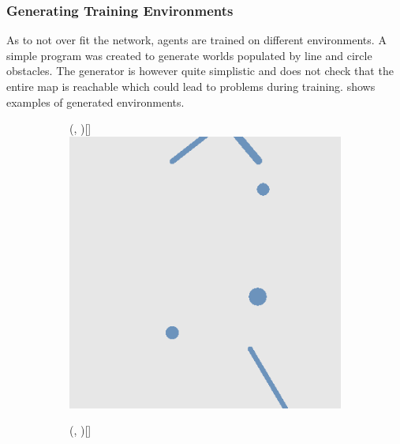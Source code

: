 \subsubsection{Generating Training Environments}
As to not over fit the network, agents are trained on different environments. A simple program was created to generate worlds populated by line and circle obstacles. The generator is however quite simplistic and does not check that the entire map is reachable which could lead to problems during training.  shows examples of generated environments. 

\def\w{0.31\textwidth}
\begin{figure}[H]
    \begin{subfigure}{\w}
        \makebox(\textwidth, \textwidth)[\textwidth]{
            \includegraphics[width=\linewidth]{figures/generated-worlds/world_0.png}
        }
    \end{subfigure}
    \hspace*{\fill}
    \begin{subfigure}{\w}
        \makebox(\textwidth, \textwidth)[\textwidth]{
}
\end{subfigure}
\end{figure}

